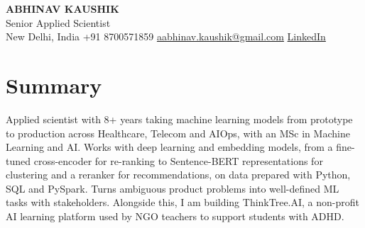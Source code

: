 \documentclass[10pt,a4paper]{article}
\begin{document}
\begin{center}
  {\LARGE\bfseries ABHINAV KAUSHIK}\\[2pt]
  {\large Senior Applied Scientist}\\[2pt]
  New Delhi, India \textbar{} +91 8700571859 \textbar{} \href{mailto:aabhinav.kaushik@gmail.com}{aabhinav.kaushik@gmail.com} \textbar{} \href{https://www.linkedin.com/in/abhinav-kaushik10/}{LinkedIn}  
\end{center}

\section{Summary}
Applied scientist with 8+ years taking machine learning models from prototype to production across Healthcare, Telecom and AIOps, with an MSc in Machine Learning and AI. Works with deep learning and embedding models, from a fine-tuned cross-encoder for re-ranking to Sentence-BERT representations for clustering and a reranker for recommendations, on data prepared with Python, SQL and PySpark. Turns ambiguous product problems into well-defined ML tasks with stakeholders. Alongside this, I am building ThinkTree.AI, a non-profit AI learning platform used by NGO teachers to support students with ADHD.
\end{document}
